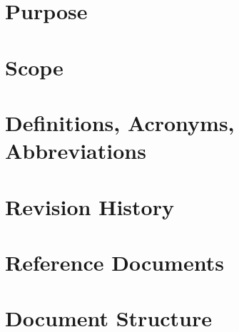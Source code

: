 
\renewcommand{\thesection}{\Alph{section}}
\section{Purpose}
\label{sec:purpose}

\section{Scope}
\label{sec:Scope}

\section{Definitions, Acronyms, Abbreviations}
\label{sec:definitions}

\section{Revision History}
\label{sec:revision}

\section{Reference Documents}
\label{sec:reference}

\section{Document Structure}
\label{sec:structure}
